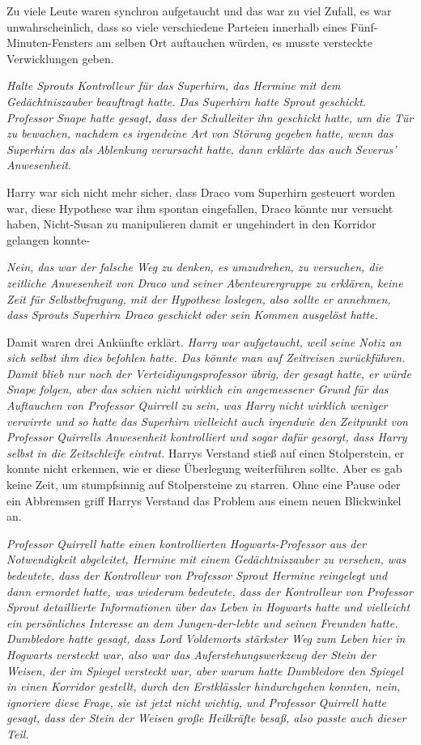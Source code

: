 Zu viele Leute waren synchron aufgetaucht und das war zu viel Zufall, es war
unwahrscheinlich, dass so viele verschiedene Parteien innerhalb eines
Fünf-Minuten-Fensters am selben Ort auftauchen würden, es musste versteckte
Verwicklungen geben.

\emph{Halte Sprouts Kontrolleur für das Superhirn, das Hermine mit dem
Gedächtniszauber beauftragt hatte. Das Superhirn hatte Sprout geschickt.
Professor Snape hatte gesagt, dass der Schulleiter ihn geschickt hatte, um die
Tür zu bewachen, nachdem es irgendeine Art von Störung gegeben hatte, wenn das
Superhirn das als Ablenkung verursacht hatte, dann erklärte das auch Severus'
Anwesenheit.}

Harry war sich nicht mehr sicher, dass Draco vom Superhirn gesteuert worden war,
diese Hypothese war ihm spontan eingefallen, Draco könnte nur versucht haben,
Nicht-Susan zu manipulieren damit er ungehindert in den Korridor gelangen
konnte-

\emph{Nein, das war der falsche Weg zu denken, es umzudrehen, zu versuchen, die
zeitliche Anwesenheit von Draco und seiner Abenteurergruppe zu erklären, keine
Zeit für Selbstbefragung, mit der Hypothese loslegen, also sollte er annehmen,
dass Sprouts Superhirn Draco geschickt oder sein Kommen ausgelöst hatte.}

Damit waren drei Ankünfte erklärt. \emph{ Harry war aufgetaucht, weil seine
Notiz an sich selbst ihm dies befohlen hatte. Das könnte man auf Zeitreisen
zurückführen. Damit blieb nur noch der Verteidigungsprofessor übrig, der gesagt
hatte, er würde Snape folgen, aber das schien nicht wirklich ein angemessener
Grund für das Auftauchen von Professor Quirrell zu sein, was Harry nicht
wirklich weniger verwirrte und so hatte das Superhirn vielleicht auch irgendwie
den Zeitpunkt von Professor Quirrells Anwesenheit kontrolliert und sogar dafür
gesorgt, dass Harry selbst in die} \emph{Zeitschleife eintrat. } Harrys Verstand
stieß auf einen Stolperstein, er konnte nicht erkennen, wie er diese Überlegung
weiterführen sollte. Aber es gab keine Zeit, um stumpfsinnig auf Stolpersteine
zu starren. Ohne eine Pause oder ein Abbremsen griff Harrys Verstand das Problem
aus einem neuen Blickwinkel an.

\emph{Professor Quirrell hatte einen kontrollierten Hogwarts-Professor aus der
Notwendigkeit abgeleitet, Hermine mit einem Gedächtniszauber zu versehen, was
bedeutete, dass der Kontrolleur von Professor Sprout Hermine reingelegt und dann
ermordet hatte, was wiederum bedeutete, dass der Kontrolleur von Professor
Sprout detaillierte Informationen über das Leben in Hogwarts hatte und
vielleicht ein persönliches Interesse an dem Jungen-der-lebte und seinen
Freunden hatte. Dumbledore hatte gesagt, dass Lord Voldemorts stärkster Weg zum
Leben hier in Hogwarts versteckt war, also war das Auferstehungswerkzeug der
Stein der Weisen, der im Spiegel versteckt war, aber warum hatte Dumbledore den
Spiegel in einen Korridor gestellt, durch den Erstklässler hindurchgehen
konnten, nein, ignoriere diese Frage, sie ist jetzt nicht wichtig, und Professor
Quirrell hatte gesagt, dass der Stein der Weisen große Heilkräfte besaß, also
passte auch dieser Teil.}

